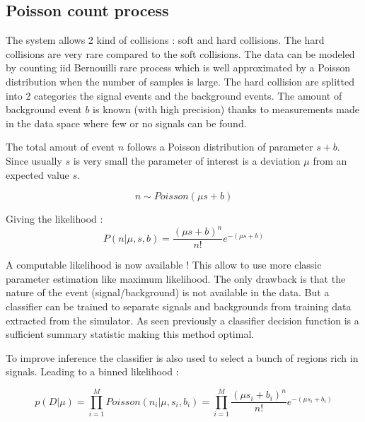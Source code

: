 \subsection{Poisson count process} %
\label{sub:poisson_count_process}

The system allows 2 kind of collisions : soft and hard collisions.
The hard collisions are very rare compared to the soft collisions.
The data can be modeled by counting iid Bernouilli rare process which is well approximated by a Poisson distribution \needcite when the number of samples is large.
The hard collision are splitted into 2 categories the signal events and the background events.
The amount of background event $b$ is known (with high precision) thanks to measurements made in the data space where few or no signals can be found.

The total amout of event $n$ follows a Poisson distribution of parameter $s + b$.
Since usually $s$ is very small the parameter of interest is a deviation $\mu$ from an expected value $s$.

\begin{equation}
	n \sim Poisson(\mu s + b)
\end{equation}

Giving the likelihood :
\begin{equation}
	P(n| \mu, s, b) = \frac{(\mu s +b)^n }{n!} e^{-(\mu s + b)}
\end{equation}

A computable likelihood is now available !
This allow to use more classic parameter estimation like maximum likelihood.
The only drawback is that the nature of the event (signal/background) is not available in the data.
But a classifier can be trained to separate signals and backgrounds from training data extracted from the simulator.
As seen previously a classifier decision function is a sufficient summary statistic making this method optimal.

To improve inference the classifier is also used to select a bunch of regions rich in signals.
Leading to a binned likelihood :

\begin{equation}
	p(D|\mu) = \prod_{i=1}^M Poisson(n_i | \mu, s_i, b_i) = \prod_{i=1}^M \frac{(\mu s_i + b_i)^n }{n!} e^{-(\mu s_i + b_i)}
\end{equation}










